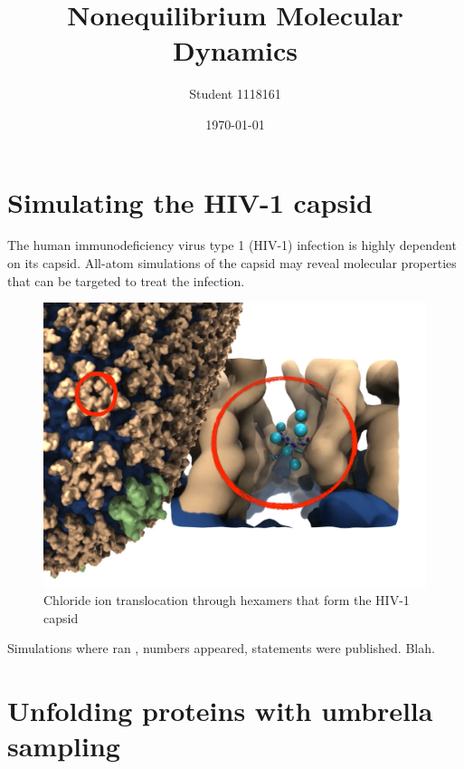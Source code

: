 \documentclass{article}[12pt]
\numberwithin{equation}{section}
\begin{document}
\title{
Nonequilibrium Molecular Dynamics
}

\author{Student 1118161}
\date{\today}
\maketitle

\section{Simulating the HIV-1 capsid}
The human immunodeficiency virus type 1 (HIV-1) infection is highly dependent on
its capsid. All-atom simulations of the capsid may reveal molecular properties
that can be targeted to treat the infection.
\begin{figure}[H]
	\centering{}
	\captionsetup{justification=centering}
	\includegraphics[scale=0.21]{hiv}
\caption{Chloride ion translocation through hexamers that form the HIV-1 capsid}
\label{fig:hiv}
\end{figure}
Simulations where ran \cite{Perilla2017}, numbers appeared, statements were published. Blah.
\pagebreak
\section{Unfolding proteins with umbrella sampling}
\end{document}
